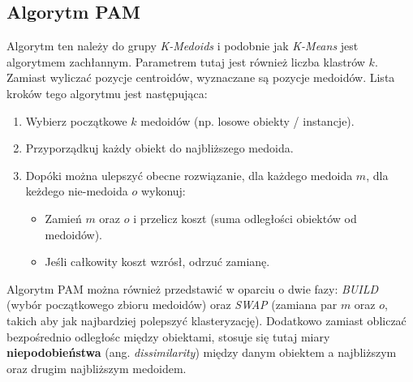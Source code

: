   \subsection{Algorytm PAM}
    Algorytm ten należy do grupy \textit{K-Medoids} i podobnie jak \textit{K-Means} jest algorytmem zachłannym. Parametrem
    tutaj jest również liczba klastrów $k$. Zamiast wyliczać pozycje centroidów, wyznaczane są pozycje medoidów. Lista kroków
    tego algorytmu jest następująca:
    \begin{enumerate}
      \item{Wybierz początkowe $k$ medoidów (np. losowe obiekty / instancje).}
      \item{Przyporządkuj każdy obiekt do najbliższego medoida.}
      \item{Dopóki można ulepszyć obecne rozwiązanie, dla każdego medoida $m$, dla keżdego nie-medoida $o$ wykonuj:}
        \begin{itemize}
          \item{Zamień $m$ oraz $o$ i przelicz koszt (suma odległości obiektów od medoidów).}
          \item{Jeśli całkowity koszt wzrósł, odrzuć zamianę.}
        \end{itemize} 
    \end{enumerate}
    Algorytm PAM można również przedstawić w oparciu o dwie fazy: \textit{BUILD} (wybór początkowego zbioru medoidów)
    oraz \textit{SWAP} (zamiana par $m$ oraz $o$, takich aby jak najbardziej polepszyć klasteryzację). Dodatkowo zamiast
    obliczać bezpośrednio odległośc między obiektami, stosuje się tutaj miary \textbf{niepodobieństwa} (ang. \textit{dissimilarity})
    między danym obiektem a najbliższym oraz drugim najbliższym medoidem. 

